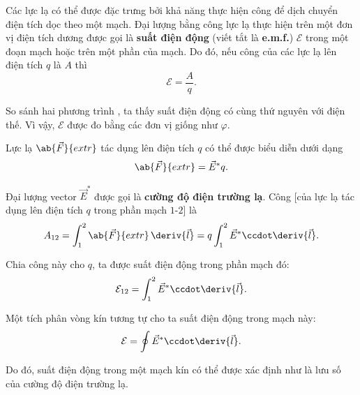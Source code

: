 Các lực lạ có thể được đặc trưng bởi khả năng thực hiện công để dịch chuyển điện tích dọc theo một mạch. Đại lượng bằng công lực lạ thực hiện trên một đơn vị điện tích dương được gọi là \textbf{suất điện động} (viết tắt là \textbf{e.m.f.}) $\mathcal{E}$ trong một đoạn mạch hoặc trên một phần của mạch. Do đó, nếu công của các lực lạ lên điện tích $q$ là $A$ thì
\begin{equation}\label{eq:5_13}
    \mathcal{E} = \frac{A}{q}.
\end{equation}

So sánh hai phương trình , ta thấy suất điện động có cùng thứ nguyên với điện thế. Vì vậy, $\mathcal{E}$ được đo bằng các đơn vị giống như $\varphi$.

Lực lạ $\ab{\vec{F}}{extr}$ tác dụng lên điện tích $q$ có thể được biểu diễn dưới dạng
\begin{equation}\label{eq:5_14}
    \ab{\vec{F}}{extr} = \vec{E}^* q.
\end{equation}

\noindent
Đại lượng vector $\vec{E}^*$ được gọi là \textbf{cường độ điện trường lạ}. Công [của lực lạ tác dụng lên điện tích $q$ trong phần mạch $1$-$2$] là 
\begin{equation*}
    A_{12} = \int_1^2 \ab{\vec{F}}{extr}\, \deriv{\vec{l}} = q \int_1^2 \vec{E}^* \ccdot \deriv{\vec{l}}.
\end{equation*}

\noindent
Chia công này cho $q$, ta được suất điện động trong phần mạch đó:
\begin{equation}\label{eq:5_15}
    \mathcal{E}_{12} = \int_1^2 \vec{E}^* \ccdot \deriv{\vec{l}}.
\end{equation}

\noindent
Một tích phân vòng kín tương tự cho ta suất điện động trong mạch này:
\begin{equation}\label{eq:5_16}
    \mathcal{E} = \oint \vec{E}^* \ccdot \deriv{\vec{l}}.
\end{equation}

\noindent
Do đó, suất điện động trong một mạch kín có thể được xác định như là lưu số của cường độ điện trường lạ.


